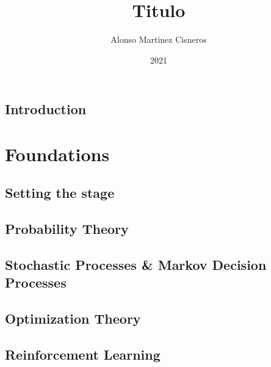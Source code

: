 \documentclass[colorful]{sty/itam-thesis}
\author{Alonso Martinez Cisneros}
\title{Titulo}
\date{2021}
\begin{document}
\frontmatter
{}
\maketitle
\makefrontmatter

\cleardoublepage
\pagestyle{plain}






\tableofcontents

\mainmatter


% 
\chapter*{Introduction}



\part{Foundations}

\chapter{Setting the stage}



\chapter{Probability Theory}
\chapter{Stochastic Processes \& Markov Decision Processes}
\chapter{Optimization Theory}
\chapter{Reinforcement Learning}

\nocite{*}
\printbibliography
\end{document}
